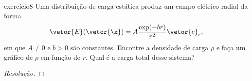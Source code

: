 \begin{exercício}{}{exercício8}
    Uma distribuição de carga estática produz um campo elétrico radial da forma
    \begin{equation*}
        \vetor{E}(\vetor{\x}) = A\frac{\exp(-br)}{r^2}\vetor{e}_r,
    \end{equation*}
    em que \(A \neq 0\) e \(b > 0\) são constantes. Encontre a densidade de carga \(\rho\) e faça um gráfico de \(\rho\) em função de \(r\). Qual é a carga total desse sistema?
\end{exercício}
\begin{proof}[Resolução]

\end{proof}
